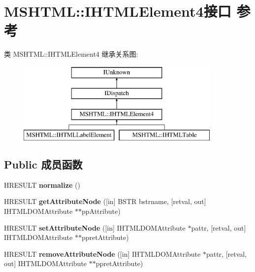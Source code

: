 \hypertarget{interface_m_s_h_t_m_l_1_1_i_h_t_m_l_element4}{}\section{M\+S\+H\+T\+ML\+:\+:I\+H\+T\+M\+L\+Element4接口 参考}
\label{interface_m_s_h_t_m_l_1_1_i_h_t_m_l_element4}
类 M\+S\+H\+T\+ML\+:\+:I\+H\+T\+M\+L\+Element4 继承关系图\+:\begin{figure}[H]
\begin{center}
\leavevmode
\includegraphics[height=4.000000cm]{interface_m_s_h_t_m_l_1_1_i_h_t_m_l_element4}
\end{center}
\end{figure}
\subsection*{Public 成员函数}
\begin{DoxyCompactItemize}
\item 
\mbox{\label{interface_m_s_h_t_m_l_1_1_i_h_t_m_l_element4_a94acd999719c5444b2f57433256130c3}} 
H\+R\+E\+S\+U\+LT {\bfseries normalize} ()
\item 
\mbox{\label{interface_m_s_h_t_m_l_1_1_i_h_t_m_l_element4_a2238fb645c56c8db1e0d348205214c13}} 
H\+R\+E\+S\+U\+LT {\bfseries get\+Attribute\+Node} (\mbox{[}in\mbox{]} B\+S\+TR bstrname, \mbox{[}retval, out\mbox{]} I\+H\+T\+M\+L\+D\+O\+M\+Attribute $\ast$$\ast$pp\+Attribute)
\item 
\mbox{\label{interface_m_s_h_t_m_l_1_1_i_h_t_m_l_element4_ab68b5bdee2dba40e004fe7f8db754732}} 
H\+R\+E\+S\+U\+LT {\bfseries set\+Attribute\+Node} (\mbox{[}in\mbox{]} I\+H\+T\+M\+L\+D\+O\+M\+Attribute $\ast$pattr, \mbox{[}retval, out\mbox{]} I\+H\+T\+M\+L\+D\+O\+M\+Attribute $\ast$$\ast$ppret\+Attribute)
\item 
\mbox{\label{interface_m_s_h_t_m_l_1_1_i_h_t_m_l_element4_a61f1c0517b5b90a4b27ab7f36a46e5fa}} 
H\+R\+E\+S\+U\+LT {\bfseries remove\+Attribute\+Node} (\mbox{[}in\mbox{]} I\+H\+T\+M\+L\+D\+O\+M\+Attribute $\ast$pattr, \mbox{[}retval, out\mbox{]} I\+H\+T\+M\+L\+D\+O\+M\+Attribute $\ast$$\ast$ppret\+Attribute)
\end{DoxyCompactItemize}
